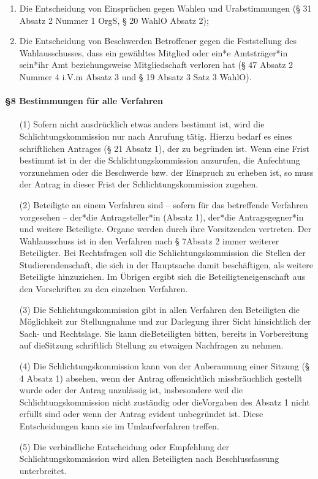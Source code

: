 \begin{itemize}
\begin{enumerate}
                        \item Die Entscheidung von Einsprüchen gegen Wahlen und Urabstimmungen (§ 31 Absatz 2 Nummer 1 OrgS, § 20 WahlO Absatz 2);
                        \item Die Entscheidung von Beschwerden Betroffener gegen die Feststellung des Wahlausschusses, dass ein gewähltes Mitglied oder ein*e Amtsträger*in sein*ihr Amt beziehungsweise Mitgliedschaft verloren hat (§ 47 Absatz 2 Nummer 4 i.V.m Absatz 3 und § 19 Absatz 3 Satz 3 WahlO).
                    \end{enumerate}
            \end{itemize}
        \paragraph{§8 Bestimmungen für alle Verfahren}
            \begin{itemize}
                \item[(1)] Sofern nicht ausdrücklich etwas anders bestimmt ist, wird die Schlichtungskommission nur nach Anrufung tätig. Hierzu bedarf es eines schriftlichen Antrages (§ 21 Absatz 1), der zu begründen ist. Wenn eine Frist bestimmt ist in der die Schlichtungskommission anzurufen, die Anfechtung vorzunehmen oder die Beschwerde bzw. der Einspruch zu erheben ist, so muss der Antrag in dieser Frist der Schlichtungskommission zugehen.
                \item[(2)] Beteiligte an einem Verfahren sind – sofern für das betreffende Verfahren vorgesehen – der*die Antragsteller*in (Absatz 1), der*die Antragsgegner*in und weitere Beteiligte. Organe werden durch ihre Vorsitzenden vertreten. Der Wahlausschuss ist in den Verfahren nach § 7Absatz 2 immer weiterer Beteiligter. Bei Rechtsfragen soll die Schlichtungskommission die Stellen der Studierendenschaft, die sich in der Hauptsache damit beschäftigen, als weitere Beteiligte hinzuziehen. Im Übrigen ergibt sich die Beteiligteneigenschaft aus den Vorschriften zu den einzelnen Verfahren.
                \item[(3)] Die Schlichtungskommission gibt in allen Verfahren den Beteiligten die Möglichkeit zur Stellungnahme und zur Darlegung ihrer Sicht hinsichtlich der Sach- und Rechtslage. Sie kann dieBeteiligten bitten, bereits in Vorbereitung auf dieSitzung schriftlich Stellung zu etwaigen Nachfragen zu nehmen.
                \item[(4)] Die Schlichtungskommission kann von der Anberaumung einer Sitzung (§ 4 Absatz 1) absehen, wenn der Antrag offensichtlich missbräuchlich gestellt wurde oder der Antrag unzulässig ist, insbesondere weil die Schlichtungskommission nicht zuständig oder dieVorgaben des Absatz 1 nicht erfüllt sind oder wenn der Antrag evident unbegründet ist. Diese Entscheidungen kann sie im Umlaufverfahren treffen.
                \item[(5)] Die verbindliche Entscheidung oder Empfehlung der Schlichtungskommission wird allen Beteiligten nach Beschlussfassung unterbreitet.
            \end{itemize}
